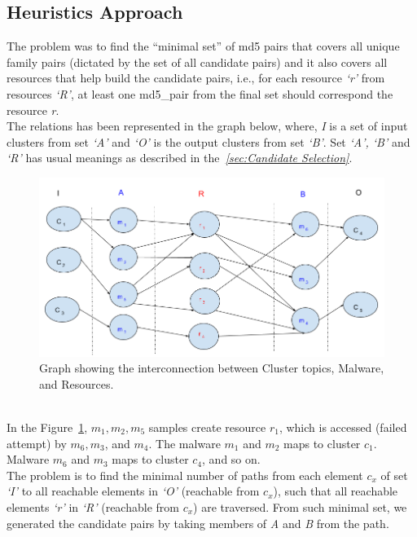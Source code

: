 \subsection{Heuristics Approach}
\label{sub:Heuristics Approach}
The problem was to find the ``minimal set'' of md5 pairs that covers all unique family pairs (dictated by the set of all candidate pairs) and it also covers all resources that help build the candidate pairs, i.e., for each resource \emph{`r'} from resources \emph{`R'}, at least one md5\_pair from the final set should correspond the resource \emph{r}.\\
The relations has been represented in the graph below, where, \emph{I} is a set of input clusters from set \emph{`A'} and \emph{`O'} is the output clusters from set \emph{`B'}. Set \emph{`A', `B'} and \emph{`R'} has usual meanings as described in the\textit{~\autoref{sec:Candidate Selection}}.
\begin{figure}[htbp]
  \centering
  \includegraphics[scale=0.45]{figures/dhkheuristics.png}
  \caption[]{Graph showing the interconnection between Cluster topics, Malware, and Resources.}\label{fig:dhkheuristics}
\end{figure}
\\
In the Figure~\ref{fig:dhkheuristics},  $m_1,m_2, m_5$ samples create resource $r_1$, which is accessed (failed attempt) by $m_6, m_3$, and $m_4$.
The malware $m_1$ and $m_2$ maps to cluster $c_1$. Malware $m_6$ and $m_3$ maps to cluster $c_4$, and so on.
\\
The problem is to find the minimal number of paths from each element \emph{$c_x$} of set \emph{`I'} to all reachable elements in \emph{`O'} (reachable from \emph{$c_x$}), such that all reachable elements \emph{`r'} in \emph{`R'} (reachable from \emph{$c_x$}) are traversed. From such minimal set, we generated the candidate pairs by taking members of \emph{A} and \emph{B} from the path.
